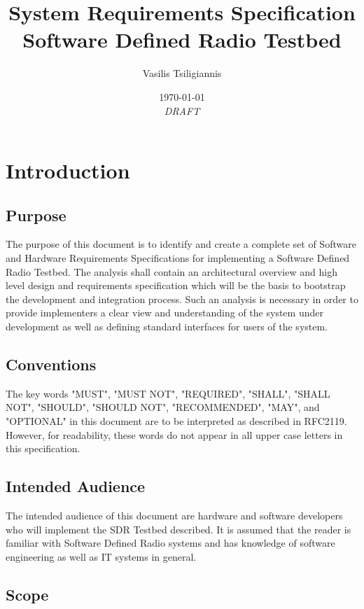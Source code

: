 \documentclass[english,titlepage,a4paper]{report}
\title{
  System Requirements Specification \\
  \large Software Defined Radio Testbed
}
\author{Vasilis Tsiligiannis}
\date{\today\\\textit{DRAFT}}
\begin{document}
\renewcommand*{\arraystretch}{2}
\maketitle
\tableofcontents


\chapter{Introduction}
\section{Purpose}

The purpose of this document is to identify and create a complete set of Software and Hardware Requirements Specifications for implementing a Software Defined Radio Testbed.
The analysis shall contain an architectural overview and high level design and requirements specification which will be the basis to bootstrap the development and integration process.
Such an analysis is necessary in order to provide implementers a clear view and understanding of the system under development as well as defining standard interfaces for users of the system.

\section{Conventions}

The key words "MUST", "MUST NOT", "REQUIRED", "SHALL", "SHALL NOT", "SHOULD", "SHOULD NOT", "RECOMMENDED", "MAY", and "OPTIONAL" in this document are to be interpreted as described in \gls{RFC2119}.
However, for readability, these words do not appear in all upper case letters in this specification.

\newpage
\printglossary[type=definitions,numberedsection,style=definitions,nonumberlist]

\section{Intended Audience}

The intended audience of this document are hardware and software developers who will implement the \gls{SDR Testbed} described.
It is assumed that the reader is familiar with Software Defined Radio systems and has knowledge of software engineering as well as IT systems in general.

\section{Scope}
\end{document}
